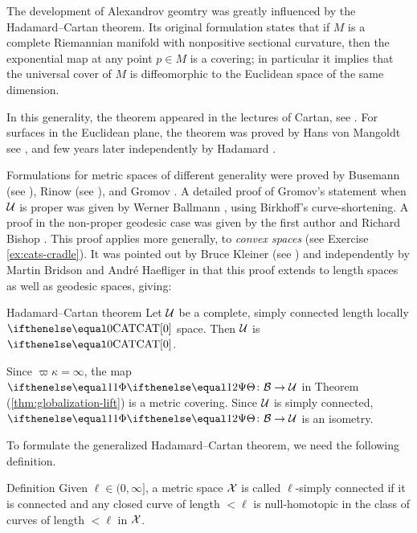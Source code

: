 The development of Alexandrov geomtry was greatly influenced by the Hadamard--Cartan theorem.
Its original formulation states that if $M$ is a complete Riemannian manifold with nonpositive sectional curvature, 
then the exponential map at any point $p\in M$ is a covering;
in particular it implies that the universal cover of $M$ is diffeomorphic to the Euclidean space of the same dimension.

In this generality, the theorem appeared in the lectures of Cartan, see \cite{cartan}.
For surfaces in the Euclidean plane, 
the theorem was proved by
Hans von Mangoldt see \cite{mangoldt},  
and few years later independently by Hadamard \cite{hadamard}.

Formulations for metric spaces of different generality were proved by 
Busemann (see \cite{busemann-CBA}),
Rinow (see \cite{rinow}), and 
Gromov  \cite[p.119]{gromov:hyp-groups}. 
A detailed proof of Gromov's statement when $\mathcal{U}$ is proper  was given by Werner Ballmann \cite{ballmann:cartan-hadamard}, using Birkhoff's curve-shortening.  
A proof in the non-proper 
geodesic case 
was given by the first author and Richard Bishop \cite{a-b:h-c}.  
This proof applies more generally, to \emph{convex spaces} (see Exercise \ref{ex:cats-cradle}).
It was pointed out by Bruce 
Kleiner (see \cite{ballmann:notes,ballmann:lectures}) 
and independently by Martin 
Bridson and Andr\'{e} 
Haefliger in \cite{BH} that 
this proof
extends to length spaces as well as geodesic spaces, giving:

\begin{thm}{Hadamard--Cartan theorem}
\label{thm:hadamard-cartan}
Let $\mathcal{U}$ be a complete,  simply connected length locally $\CAT0$ space.
Then $\mathcal{U}$ is $\CAT0$.
\end{thm}

 Since $\varpi\kappa=\infty$,
the map $\map\:\spc{B}\to\spc{U}$ in Theorem
 (\ref{thm:globalization-lift}) is a metric covering. 
Since $\mathcal{U}$ is simply connected, $\map\:\spc{B}\to\spc{U}$ is an isometry.
\qeds

To formulate the generalized Hadamard--Cartan theorem,
we need the following definition.

\begin{thm}{Definition}\label{def:l-s.c.}
Given $\ell\in (0,\infty]$,
a metric space $\mathcal{X}$ is called 
$\ell$-simply connected 
if it is connected and 
any closed curve of length $<\ell$ 
is null-homotopic in the class of curves of length $<\ell$ in $\mathcal{X}$.
\end{thm}

